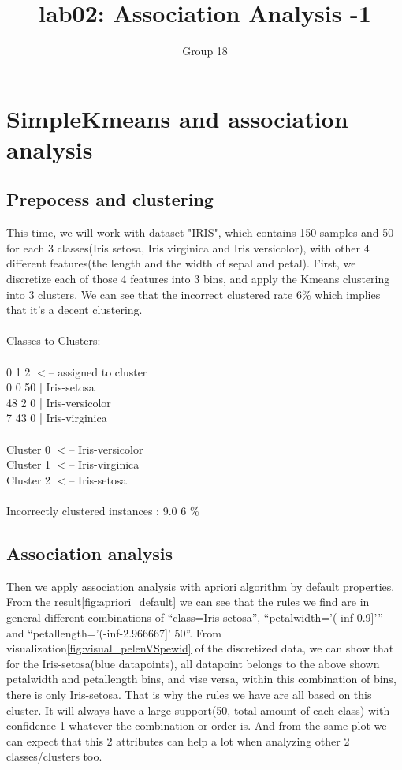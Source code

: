 \documentclass{article}
\title{lab02: Association Analysis -1}
\author{Group 18}
\begin{document}
\maketitle

\section{SimpleKmeans and association analysis}
\subsection{Prepocess and clustering}

This time, we will work with dataset "IRIS", which contains 150 samples and 50 for each 3 classes(Iris setosa, Iris virginica and Iris versicolor), with other 4 different features(the length and the width of sepal and petal).
First, we discretize each of those 4 features into 3 bins, and apply the Kmeans clustering into 3 clusters. We can see that the incorrect clustered rate 6\% which implies that it’s a decent clustering.\\  
\\
Classes to Clusters:\\
\\
  0  1  2  $<$-- assigned to cluster  \\
  0  0 50 | Iris-setosa  \\
 48  2  0 | Iris-versicolor \\
  7 43  0 | Iris-virginica\\
\\
Cluster 0 $<$-- Iris-versicolor  \\
Cluster 1 $<$-- Iris-virginica \\ 
Cluster 2 $<$-- Iris-setosa \\ 
\\
Incorrectly clustered instances :	9.0	  6      \% 

\subsection{Association analysis}

Then we apply association analysis with apriori algorithm by default properties. From the result\ref{fig:apriori_default} we can see that the rules we find are in general different combinations of “class=Iris-setosa”, “petalwidth='(-inf-0.9]'” and “petallength='(-inf-2.966667]' 50”. From visualization\ref{fig:visual_pelenVSpewid} of the discretized data, we can show that for the Iris-setosa(blue datapoints), all datapoint belongs to the above shown petalwidth and petallength bins, and vise versa, within this combination of bins, there is only Iris-setosa. That is why the rules we have are all based on this cluster. It will always have a large support(50, total amount of each class) with confidence 1 whatever the combination or order is. And from the same plot we can expect that this 2 attributes can help a lot when analyzing other 2 classes/clusters too.
\end{document}
